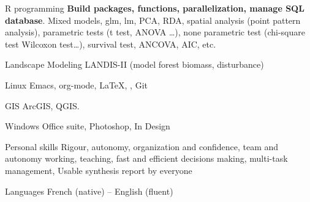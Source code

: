 



  \begin{cvskillslong}


  \cvskilllong
    {R programming} %
    {\textnormal{\textbf{Build packages, functions, parallelization,
          manage SQL database}. Mixed models, glm, lm, PCA, RDA, spatial analysis (point pattern analysis), parametric tests (t test, ANOVA …), none parametric test (chi-square test Wilcoxon test…), survival test, ANCOVA, AIC, etc.}} %

  \cvskilllong
    {Landscape Modeling} %
    {\textnormal{LANDIS-II (model forest biomass, disturbance)}} %

  \cvskilllong
    {Linux} %
    {\textnormal{Emacs, org-mode, {\LaTeX}, , Git}} %

  \cvskilllong
    {GIS} %
    {\textnormal{ArcGIS, QGIS.}} %
    
  \cvskilllong
    {Windows} %
    {\textnormal{Office suite, Photoshop, In Design}} %
    


  \cvskilllong
  {Personal skills}
  {\textnormal{Rigour, autonomy, organization and confidence, team and autonomy
    working, teaching, fast and efficient decisions making, multi-task
    management, Usable synthesis report by everyone}}

  \cvskilllong
    {Languages} %
    {\textnormal{French (native) – English (fluent)}} %

\end{cvskillslong}

